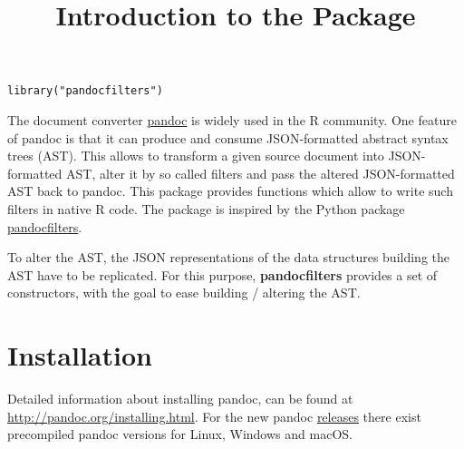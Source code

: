 \documentclass[a4paper]{article}\usepackage[]{graphicx}\usepackage[]{color}
\title{Introduction to the \pkg{pandocfilters} Package}
\makeatletter
\newcommand{\hlstr}[1]{\textcolor[rgb]{0.741,0.553,0.545}{#1}}%
\newcommand{\hlstd}[1]{\textcolor[rgb]{0,0,0}{#1}}%
\newcommand{\hlkwd}[1]{\textcolor[rgb]{0,0,0}{#1}}%
\newenvironment{kframe}{%
 \def\at@end@of@kframe{}%
 \ifinner\ifhmode%
  \def\at@end@of@kframe{\end{minipage}}%
  \begin{minipage}{\columnwidth}%
 \fi\fi%
 \def\FrameCommand##1{\hskip\@totalleftmargin \hskip-\fboxsep
 \colorbox{shadecolor}{##1}\hskip-\fboxsep
     \hskip-\linewidth \hskip-\@totalleftmargin \hskip\columnwidth}%
 \MakeFramed {\advance\hsize-\width
   \@totalleftmargin\z@ \linewidth\hsize
   \@setminipage}}%
 {\par\unskip\endMakeFramed%
 \at@end@of@kframe}
\newenvironment{knitrout}{}{} %
\newcommand{\pkg}[1]{\textbf{#1}}
\newcommand{\proglang}[1]{\textsf{#1}}
\makeatother
\begin{document}
\sloppy
\maketitle

\begin{knitrout}
\color{fgcolor}\begin{kframe}
\begin{alltt}
\hlkwd{library}\hlstd{(}\hlstr{"pandocfilters"}\hlstd{)}
\end{alltt}


{\ttfamily\noindent\itshape\color{messagecolor}{\#\# \\\#\# Attaching package: 'pandocfilters'}}

{\ttfamily\noindent\itshape\color{messagecolor}{\#\# The following object is masked from 'package:stats':\\\#\# \\\#\# \ \ \ \ filter}}

{\ttfamily\noindent\itshape\color{messagecolor}{\#\# The following object is masked from 'package:methods':\\\#\# \\\#\# \ \ \ \ Math}}\end{kframe}
\end{knitrout}

The document converter \href{https://pandoc.org/}{pandoc} is widely used
in the R community. One feature of pandoc is that it can produce and consume
JSON-formatted abstract syntax trees (AST). This allows to transform a given
source document into JSON-formatted AST, alter it by so called filters and pass
the altered JSON-formatted AST back to pandoc. This package provides functions
which allow to write such filters in native R code. The package is inspired by
the Python package \href{https://github.com/jgm/pandocfilters/}{pandocfilters}.

To alter the AST, the JSON representations of the data structures building the AST
have to be replicated. For this purpose, \pkg{pandocfilters} provides a set of 
constructors, with the goal to ease building / altering the AST.

\section{Installation}
Detailed information about installing pandoc, can be found at 
\url{http://pandoc.org/installing.html}.
For the new pandoc \href{https://github.com/jgm/pandoc/releases}{releases}
there exist precompiled pandoc versions for \proglang{Linux}, \proglang{Windows}
and \proglang{macOS}.
\end{document}
